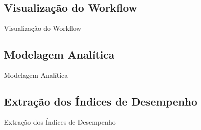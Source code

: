 \documentclass[xcolor=x11names,compress]{beamer}
\renewcommand{\(}{\begin{columns}}
\renewcommand{\)}{\end{columns}}
\newcommand{\<}[1]{\begin{column}{#1}}
\renewcommand{\>}{\end{column}}
\begin{document}
    \subsection{Visualização do Workflow}
        \begin{frame}{Visualização do Workflow}

        \end{frame}

    \subsection{Modelagem Analítica}
        \begin{frame}{Modelagem Analítica}

        \end{frame}

    \subsection{Extração dos Índices de Desempenho}
        \begin{frame}{Extração dos Índices de Desempenho}

        \end{frame}
\end{document}
